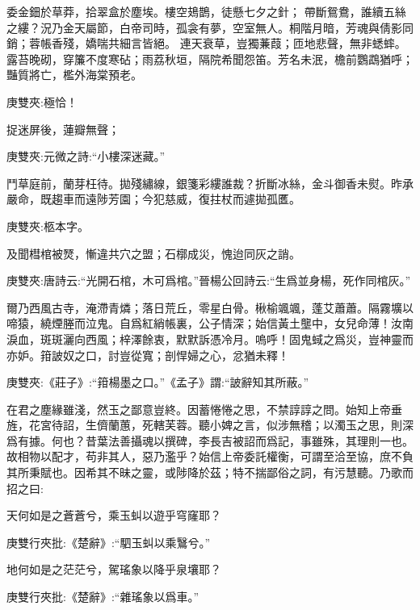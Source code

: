 \begin{qute2sp}
\begin{parag}
        委金鈿於草莽，拾翠盒於塵埃。樓空鳷鵲，徒懸七夕之針；
        帶斷鴛鴦，誰續五絲之縷？況乃金天屬節，白帝司時，孤衾有夢，空室無人。桐階月暗，芳魂與倩影同銷；蓉帳香殘，嬌喘共細言皆絕。
        連天衰草，豈獨蒹葭；匝地悲聲，無非蟋蟀。
        露苔晚砌，穿簾不度寒砧；雨荔秋垣，隔院希聞怨笛。芳名未泯，檐前鸚鵡猶呼；豔質將亡，檻外海棠預老。
        \begin{note}庚雙夾:極恰！\end{note}
        捉迷屏後，蓮瓣無聲；
        \begin{note}庚雙夾:元微之詩:“小樓深迷藏。”\end{note}
        鬥草庭前，蘭芽枉待。拋殘繡線，銀箋彩縷誰裁？折斷冰絲，金斗御香未熨。昨承嚴命，既趨車而遠陟芳園；今犯慈威，復拄杖而遽拋孤匶。\begin{note}庚雙夾:柩本字。
        \end{note}及聞槥棺被燹，慚違共穴之盟；石槨成災，愧迨同灰之誚。
        \begin{note}庚雙夾:唐詩云:“光開石棺，木可爲棺。”晉楊公回詩云:“生爲並身楊，死作同棺灰。”\end{note}
        爾乃西風古寺，淹滯青燐；落日荒丘，零星白骨。楸榆颯颯，蓬艾蕭蕭。隔霧壙以啼猿，繞煙塍而泣鬼。自爲紅綃帳裏，公子情深；始信黃土壟中，女兒命薄！汝南淚血，斑斑灑向西風；梓澤餘衷，默默訴憑冷月。嗚呼！固鬼蜮之爲災，豈神靈而亦妒。箝詖奴之口，討豈從寬；剖悍婦之心，忿猶未釋！
        \begin{note}庚雙夾:《莊子》:“箝楊墨之口。”《孟子》謂:“詖辭知其所蔽。”\end{note}
        在君之塵緣雖淺，然玉之鄙意豈終。因蓄惓惓之思，不禁諄諄之問。始知上帝垂旌，花宮待詔，生儕蘭蕙，死轄芙蓉。聽小婢之言，似涉無稽；以濁玉之思，則深爲有據。何也？昔葉法善攝魂以撰碑，李長吉被詔而爲記，事雖殊，其理則一也。故相物以配才，苟非其人，惡乃濫乎？始信上帝委託權衡，可謂至洽至協，庶不負其所秉賦也。因希其不昧之靈，或陟降於茲；特不揣鄙俗之詞，有污慧聽。乃歌而招之曰:
    \end{parag}


    \begin{poem}
        \begin{pl}天何如是之蒼蒼兮，乘玉虯以遊乎穹窿耶？\end{pl}
        \begin{note}庚雙行夾批:《楚辭》:“駟玉虯以乘鷖兮。”\end{note}

        \begin{pl}地何如是之茫茫兮，駕瑤象以降乎泉壤耶？\end{pl}
        \begin{note}庚雙行夾批:《楚辭》:“雜瑤象以爲車。”\end{note}


\end{poem}
\end{qute2sp}
